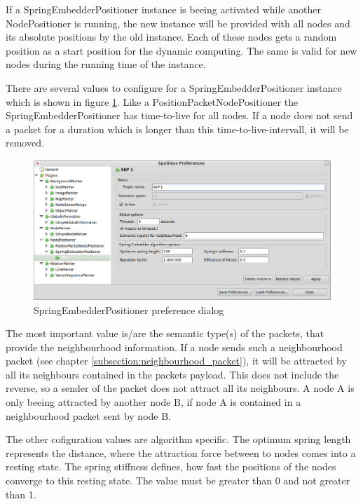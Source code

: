 If a SpringEmbedderPositioner instance is beeing activated while another NodePositioner is running, the new
instance will be provided with all nodes and its absolute positions by the old instance. Each of these nodes
gets a random position as a start position for the dynamic computing. The same is valid for new nodes during
the running time of the instance.

There are several values to configure for a SpringEmbedderPositioner instance which is shown in figure
\ref{pic:sep_preferences}. Like a PositionPacketNodePositioner
the SpringEmbedderPositioner has time-to-live for all nodes. If a node does not send a packet for a duration
which is longer than this time-to-live-intervall, it will be removed.

\begin{figure}[htb]
  \begin{center}
    \includegraphics[width=13.2cm]{./pics/springembedderpositioner_prefpage}
    \caption{SpringEmbedderPositioner preference dialog}
    \label{pic:sep_preferences}
  \end{center}
\end{figure}

The most important value is/are the semantic type(s) of the packets, that provide the neighbourhood information.
If a node sends such a neighbourhood packet (see chapter \ref{subsection:neighbourhood_packet}), it will be
attracted by all its neighbours contained in the packets payload. This does not include the reverse, so a sender of the
packet does not attract all its neighbours. A node A is only beeing attracted by another node B, if node A is contained
in a neighbourhood packet sent by node B.

The other cofiguration values are algorithm specific. The optimum spring length represents the distance, where the
attraction force between to nodes comes into a resting state. The spring stiffness defines, how fast the positions
of the nodes converge to this resting state. The value must be greater than 0 and not greater than 1.

